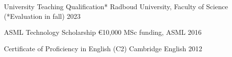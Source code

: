 

\begin{cvhonors}

  \cvhonor
    {University Teaching Qualification*} %
    {Radboud University, Faculty of Science (*Evaluation in fall)} %
    {} %
    {2023} %

  \cvhonor
    {ASML Technology Scholarship} %
    {€10,000 MSc funding, ASML} %
    {} %
    {2016} %

  \cvhonor
    {Certificate of Proficiency in English (C2)} %
    {Cambridge English} %
    {} %
    {2012} %


\end{cvhonors}
